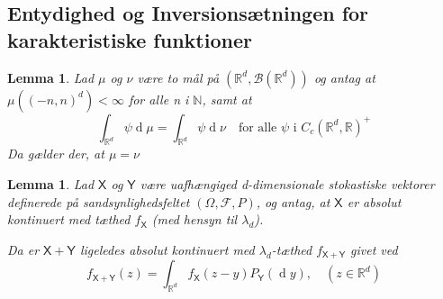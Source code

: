 \documentclass{article}
\newcommand{\N}{\mathbb{N}}
\newcommand{\R}{\mathbb{R}}
\newcommand{\1}{\mathbbm{1}}
\newcommand{\X}{\mathsf{X}}
\newcommand{\Y}{\mathsf{Y}}
\newcommand{\B}{\mathcal{B}}
\newcommand{\deriv}{\operatorname{d}}
\newcommand{\pfield}{(\Omega, \mathcal{F}, P)}
\newtheorem{lemma}[theorem]{Lemma}
\theoremstyle{boxed}
\begin{document}
\subsection{Entydighed og Inversionsætningen for karakteristiske funktioner}
\begin{theorem-box}
    \begin{lemma}
        Lad $\mu$ og $\nu$ være to mål på $(\R^d, \B(\R^d))$ og antag at $\mu((-n,n)^d)<\infty$ for alle n i $\N$, samt at
        $$\int_{\R^d}\psi \deriv \mu =\int_{\R^d}\psi \deriv \nu\quad \text{for alle }\psi \text{ i } C_c(\R^d,\R)^+$$
        Da gælder der, at $\mu=\nu$
    \end{lemma}
\end{theorem-box}
\begin{theorem-box}
    \begin{lemma}
        Lad $\X$ og $\Y$ være uafhængiged d-dimensionale stokastiske vektorer definerede på sandsynlighedsfeltet $\pfield$, og antag, at $\X$ er absolut kontinuert med tæthed $f_\X$ (med hensyn til $\lambda_d$).

        Da er $\X+\Y$ ligeledes absolut kontinuert med $\lambda_d$-tæthed $f_{\X+\Y}$ givet ved
        $$f_{\X+\Y}(z)=\int_{\R^d}f_\X(z-y)P_\Y(\deriv y), \quad (z\in\R^d)$$
    \end{lemma}
\end{theorem-box}
\end{document}
